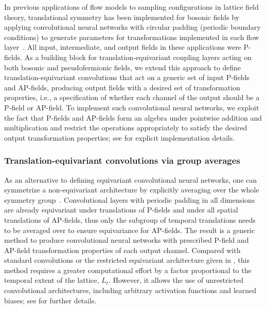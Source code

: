 \documentclass[aps,prd,twocolumn,nofootinbib,superscriptaddress,preprintnumbers]{revtex4-1}
\begin{document}
In previous applications of flow models to sampling configurations in lattice field theory, translational symmetry has been implemented for bosonic fields by applying convolutional neural networks \cite{lecun-99} with circular padding (periodic boundary conditions) to generate parameters for transformations implemented in each flow layer~\cite{Albergo:2019eim,Nicoli:2020njz,medvidovic2021generative}. All input, intermediate, and output fields in these applications were P-fields. As a building block for translation-equivariant coupling layers acting on both bosonic and pseudofermionic fields, we extend this approach to define translation-equivariant convolutions that act on a generic set of input P-fields and AP-fields, producing output fields with a desired set of transformation properties, i.e., a specification of whether each channel of the output should be a P-field or AP-field. To implement such convolutional neural networks, we exploit the fact that P-fields and AP-fields form an algebra under pointwise addition and multiplication and restrict the operations appropriately to satisfy the desired output transformation properties; see  for explicit implementation details.


\subsubsection{Translation-equivariant convolutions via group averages}
\label{sec:group-equiv}

As an alternative to defining equivariant convolutional neural networks, one can symmetrize a non-equivariant architecture by explicitly averaging over the whole symmetry group~\cite{cohen2016group}. Convolutional layers with periodic padding in all dimensions are already equivariant under translations of P-fields and under all spatial translations of AP-fields, thus only the subgroup of temporal translations needs to be averaged over to ensure equivariance for AP-fields. The result is a generic method to produce convolutional neural networks with prescribed P-field and AP-field transformation properties of each output channel. Compared with standard convolutions or the restricted equivariant architecture given in , this method requires a greater computational effort by a factor proportional to the temporal extent of the lattice, $L_t$. However, it allows the use of unrestricted convolutional architectures, including arbitrary activation functions and learned biases; see  for further details.
\end{document}

